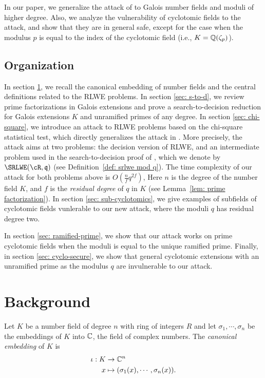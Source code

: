 \documentclass{amsart}
\begin{document}
In our paper, we generalize the attack of \cite{elos2015weak} to Galois number fields and moduli of higher degree. Also, we analyze the vulnerability of cyclotomic fields to the \cite{elos2015weak} attack, and show that they are in general safe, except for the case when the modulus $p$ is equal to the index of the cyclotomic field (i.e., $K = \mathbb{Q}(\zeta_p)$).


\subsection{Organization}

In section \ref{sec: background}, we recall the canonical embedding of number fields and the central definitions related to the RLWE problems. In section \ref{sec: s-to-d}, we review prime factorizations in Galois extensions and prove a search-to-decision reduction for Galois extensions $K$ and unramified primes of any degree. In section \ref{sec: chi-square}, we introduce an attack to RLWE problems based on the chi-square statistical test, which directly generalizes the attack in \cite{elos2015weak}. More precisely, the attack aims at two problems: the decision version of RLWE, and an intermediate problem used in the search-to-decision proof of \cite{lyubashevsky2013ideal}, which we denote by $\SRLWE(\cR,\fq)$ (see Definition~\ref{def: srlwe mod q}). The time complexity of our attack for both problems above is $O(\frac{n}{f}q^{2f})$, Here $n$ is the degree of the number field $K$, and $f$ is the {\it residual degree} of $q$ in $K$ (see Lemma~\ref{lem: prime factorization}). In section \ref{sec: sub-cyclotomics}, we give examples of subfields of cyclotomic fields vunlerable to our new attack, where the moduli $q$ has residual degree two.

In section \ref{sec: ramified-prime}, we show that our attack works on prime cyclotomic fields when the moduli is equal to the unique ramified prime. Finally, in section \ref{sec: cyclo-secure}, we show that general cyclotomic extensions with an unramified prime as the modulus $q$ are invulnerable to our attack.





\section{Background} \label{sec: background}

Let $K$ be a number field of degree $n$ with ring of integers $R$ and let $\sigma_1, \cdots, \sigma_n$ be the embeddings of $K$ into $\mathbb{C}$, the field of complex numbers. The {\it canonical embedding} of $K$ is
\begin{align*}
    \iota: K &\to \mathbb{C}^n \\
     x & \mapsto (\sigma_1(x), \cdots, \sigma_n(x)).
\end{align*}
\end{document}
